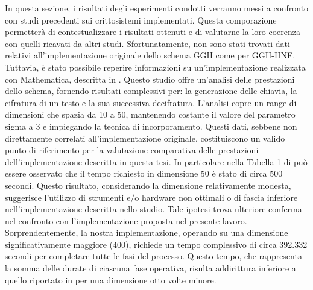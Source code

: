 In questa sezione, i risultati degli esperimenti condotti verranno messi a confronto 
con studi precedenti sui crittosistemi implementati. Questa comporazione permetterà di 
contestualizzare i risultati ottenuti e di valutarne la loro coerenza con quelli ricavati
da altri studi. 
Sfortunatamente, non sono stati trovati dati relativi all'implementazione originale dello schema 
GGH come per GGH-HNF. Tuttavia, è stato possibile reperire informazioni su un'implementazione realizzata 
con Mathematica, descritta in \cite{GGH16}. Questo studio offre un'analisi delle prestazioni 
dello schema, fornendo risultati complessivi per: la generazione delle chiavia, la cifratura 
di un testo e la sua successiva decifratura. L'analisi copre un range di dimensioni che 
spazia da 10 a 50, mantenendo costante il valore del parametro sigma a 3 e 
impiegando la tecnica di incorporamento. Questi dati, sebbene non direttamente correlati 
all'implementazione originale, costituiscono un valido punto di riferimento per la valutazione 
comparativa delle prestazioni dell'implementazione descritta in questa tesi. In particolare 
nella Tabella 1 di \cite[Sezione 6]{GGH16} può essere osservato che il tempo richiesto 
in dimensione 50 è stato di circa 500 secondi. 
Questo risultato, considerando la dimensione relativamente modesta, suggerisce l'utilizzo 
di strumenti e/o hardware non ottimali o di fascia inferiore nell'implementazione descritta 
nello studio. Tale ipotesi trova ulteriore conferma nel confronto con l'implementazione 
proposta nel presente lavoro. Sorprendentemente, la nostra implementazione, operando su 
una dimensione significativamente maggiore (400), richiede un tempo complessivo di circa 
392.332 secondi per completare tutte le fasi del processo. Questo tempo, che rappresenta 
la somma delle durate di ciascuna fase operativa, risulta addirittura inferiore a quello 
riportato in \cite{GGH16} per una dimensione otto volte minore. 

